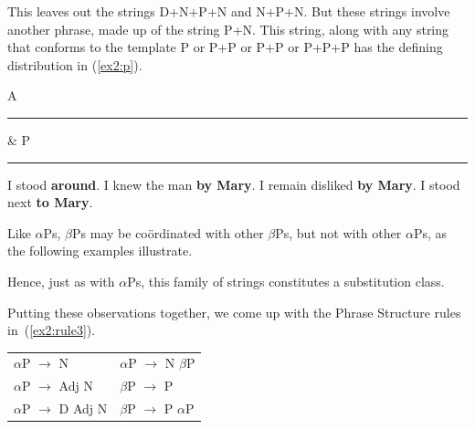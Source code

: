 This leaves out the strings D+N+P+N and N+P+N. But these strings involve another phrase, made up of the string P+N. This string, along with any string that conforms to the template P or P+{\al}P or P+P or P+P+{\al}P has the defining distribution in (\ref{ex2:p}).
\pagebreak
\begin{exe}
\ex \label{ex2:p}  A \rule{5mm}{.1mm} \& P \rule{5mm}{.1mm}
\begin{xlist}
	\ex I stood \textbf{around}.
	\ex I knew the man \textbf{by Mary}.
	\ex I remain disliked \textbf{by Mary}.
	\ex I stood next \textbf{to Mary}.
\end{xlist}
\end{exe}
Like $\alpha$Ps, $\beta$Ps may be co\"ordinated with other $\beta$Ps, but not with other $\alpha$Ps, as the following examples illustrate.
\begin{exe}
	\ex \label{ex2:phrase4} 
	\begin{xlist}
	\end{xlist}
\end{exe}
Hence, just as with {$\alpha$}Ps, this family of strings constitutes a substitution class.

Putting these observations together, we come up with the Phrase Structure rules in~(\ref{ex2:rule3}).
\begin{exe}
	\ex \label{ex2:rule3} 
	\begin{tabular}{ll}
	$\alpha$P $\rightarrow$ N & $\alpha$P $\rightarrow$ N $\beta$P\\
	$\alpha$P $\rightarrow$ Adj N & $\beta$P $\rightarrow$ P\\
	$\alpha$P $\rightarrow$ D Adj N & $\beta$P $\rightarrow$ P $\alpha$P	
	\end{tabular}
\end{exe}

